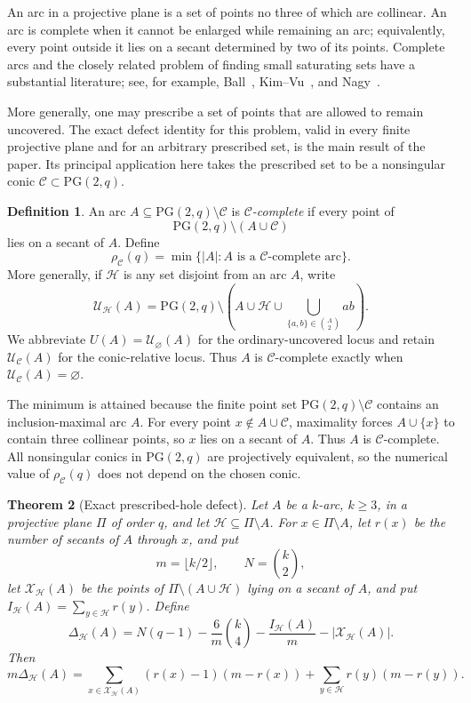 \documentclass[11pt]{article}
\newtheorem{theorem}{Theorem}[section]
\theoremstyle{definition}
\newtheorem{definition}[theorem]{Definition}
\theoremstyle{remark}
\newcommand{\PG}{\mathrm{PG}}
\newcommand{\cC}{\mathcal{C}}
\newcommand{\cH}{\mathcal{H}}
\newcommand{\cU}{\mathcal{U}}
\newcommand{\cX}{\mathcal{X}}
\newcommand{\IH}{I_{\cH}}
\newcommand{\rhoC}{\rho_{\cC}}
\begin{document}
An arc in a projective plane is a set of points no three of which are
collinear.  An arc is complete when it cannot be enlarged while remaining
an arc; equivalently, every point outside it lies on a secant determined by
two of its points.  Complete arcs and the closely related problem of finding
small saturating sets have a substantial literature; see, for example,
Ball~\cite{Ball1997}, Kim--Vu~\cite{KimVu2003}, and Nagy~\cite{Nagy2018}.

More generally, one may prescribe a set of points that are allowed to
remain uncovered.  The exact defect identity for this problem, valid in
every finite projective plane and for an arbitrary prescribed set, is the
main result of the paper.  Its principal application here takes the
prescribed set to be a nonsingular conic
$\cC\subset\PG(2,q)$.

\begin{definition}\label{def:relative}
An arc $A\subseteq\PG(2,q)\setminus\cC$ is \emph{$\cC$-complete} if every
point of
\[
 \PG(2,q)\setminus(A\cup\cC)
\]
lies on a secant of $A$.  Define
\[
 \rhoC(q)=\min\{|A|:A\text{ is a $\cC$-complete arc}\}.
\]
More generally, if $\cH$ is any set disjoint from an arc $A$, write
\[
 \cU_{\cH}(A)=
 \PG(2,q)\setminus
 \left(A\cup\cH\cup\bigcup_{\{a,b\}\in\binom A2}ab\right).
\]
We abbreviate $U(A)=\cU_{\varnothing}(A)$ for the ordinary-uncovered locus
and retain $\cU_{\cC}(A)$ for the conic-relative locus.
Thus $A$ is $\cC$-complete exactly when $\cU_{\cC}(A)=\varnothing$.
\end{definition}

The minimum is attained because the finite point set
$\PG(2,q)\setminus\cC$ contains an inclusion-maximal arc \(A\).  For every
point \(x\notin A\cup\cC\), maximality forces \(A\cup\{x\}\) to contain
three collinear points, so \(x\) lies on a secant of \(A\).  Thus \(A\) is
\(\cC\)-complete.  All nonsingular conics in $\PG(2,q)$ are
projectively equivalent, so the numerical value of $\rhoC(q)$ does not
depend on the chosen conic.

\begin{theorem}[Exact prescribed-hole defect]\label{thm:main}
Let \(A\) be a \(k\)-arc, \(k\ge3\), in a projective plane \(\Pi\) of
order \(q\), and let \(\cH\subseteq\Pi\setminus A\).  For
\(x\in\Pi\setminus A\), let \(r(x)\) be the number of secants of \(A\) through
\(x\), and put
\[
 m=\lfloor k/2\rfloor,\qquad N=\binom{k}{2},
\]
let \(\cX_{\cH}(A)\) be the points of
\(\Pi\setminus(A\cup\cH)\) lying on a secant of \(A\), and put
\(\IH(A)=\sum_{y\in\cH}r(y)\).  Define
\[
 \Delta_{\cH}(A)=
 N(q-1)-\frac{6}{m}\binom{k}{4}
 -\frac{\IH(A)}m-|\cX_{\cH}(A)|.
\]
Then
\[
 m\Delta_{\cH}(A)=
 \sum_{x\in\cX_{\cH}(A)}(r(x)-1)(m-r(x))
 +\sum_{y\in\cH}r(y)(m-r(y)).
\]
\end{theorem}
\end{document}
